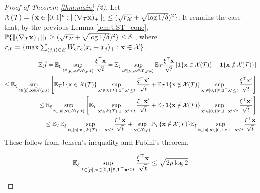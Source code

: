 \begin{proof}[Proof of Theorem \ref{thm:main} (2)]

Let $\mathcal{X}({\mathcal{T}}) = \{ \mathbf{x} \in [0,1]^p : \| (\nabla_{\mathcal{T}} \mathbf{x})_+ \|_1 \le (\sqrt{r_{\mathcal{X}}} + \sqrt{\log 1 / \delta} )^2 \}$.
It remains the case that, by the previous Lemma \ref{lem:UST_conc}, $\mathbb{P} \{ \| (\nabla_{\mathcal{T}} \mathbf{x})_+ \|_1 \ge (\sqrt{r_{\mathcal{X}}} + \sqrt{\log 1 / \delta} )^2 \} \le \delta$ , where $r_{\mathcal{X}} = \{ \max {\sum_{(j,i) \in E} W_e r_e (x_i - x_j)_+ : \mathbf{x}\in \mathcal{X}}\}$.
\[
\begin{aligned}
\mathbb{E}_\xi \hat l = \mathbb{E}_\xi \sup_{t \in [p],\mathbf{x} \in \mathcal{X}(\rho,t)} \frac{\xi^\top \mathbf{x}}{\sqrt{t}} = \mathbb{E}_\xi \sup_{t \in [p],\mathbf{x} \in \mathcal{X}(\rho,t)} \mathbb{E}_{\mathcal{T}}  \frac{\xi^\top \mathbf{x}}{\sqrt{t}} \left[ {\bf 1}\{ \mathbf{x} \in \mathcal{X}({\mathcal{T}}) \} + {\bf 1}\{ \mathbf{x} \notin \mathcal{X}({\mathcal{T}}) \} \right] \\
\le \mathbb{E}_\xi \sup_{t \in [p],\mathbf{x} \in \mathcal{X}(\rho,t)} \left[ \mathbb{E}_{\mathcal{T}} {\bf 1}\{ \mathbf{x} \in \mathcal{X}({\mathcal{T}}) \} \sup_{\mathbf{x}' \in \mathcal{X}({\mathcal{T}}), {\bf 1}^\top \mathbf{x}' \le t}  \frac{\xi^\top \mathbf{x}'}{\sqrt{t}}
+ \mathbb{E}_{\mathcal{T}} {\bf 1}\{ \mathbf{x} \notin \mathcal{X}({\mathcal{T}}) \} \sup_{\mathbf{x}' \in [0,1]^p, {\bf 1}^\top \mathbf{x}' \le t} \frac{\xi^\top \mathbf{x}'}{\sqrt{t}} \right]\\
\le \mathbb{E}_\xi \sup_{t \in [p],\mathbf{x} \in \mathcal{X}(\rho,t)} \left[ \mathbb{E}_{\mathcal{T}} \sup_{\mathbf{x}' \in \mathcal{X}({\mathcal{T}}), {\bf 1}^\top \mathbf{x}' \le t}  \frac{\xi^\top \mathbf{x}'}{\sqrt{t}}
+ \mathbb{E}_{\mathcal{T}} {\bf 1}\{ \mathbf{x} \notin \mathcal{X}({\mathcal{T}}) \} \sup_{\mathbf{x}' \in [0,1]^p, {\bf 1}^\top \mathbf{x}' \le t} \frac{\xi^\top \mathbf{x}'}{\sqrt{t}} \right]\\
\le \mathbb{E}_{\mathcal{T}} \mathbb{E}_\xi \sup_{t \in [p], \mathbf{x} \in \mathcal{X}({\mathcal{T}}), {\bf 1}^\top \mathbf{x} \le t}  \frac{\xi^\top \mathbf{x}}{\sqrt{t}}
+ \sup_{\mathbf{x} \in \mathcal{X}(\rho)} \mathbb{P}_{\mathcal{T}} \{ \mathbf{x} \notin \mathcal{X}({\mathcal{T}}) \} \mathbb{E}_\xi \sup_{t \in [p], \mathbf{x} \in [0,1]^p, {\bf 1}^\top \mathbf{x} \le t} \frac{\xi^\top \mathbf{x}}{\sqrt{t}} \\
\end{aligned}
\]
These follow from Jensen's inequality and Fubini's theorem.
\begin{claim}
\[
\mathbb{E}_\xi \sup_{t \in [p],\mathbf{x} \in [0,1]^p, {\bf 1}^\top \mathbf{x} \le t} \frac{\xi^\top \mathbf{x}}{\sqrt{t}} \le \sqrt{2 p \log 2}
\]
\end{claim}


\end{proof}
